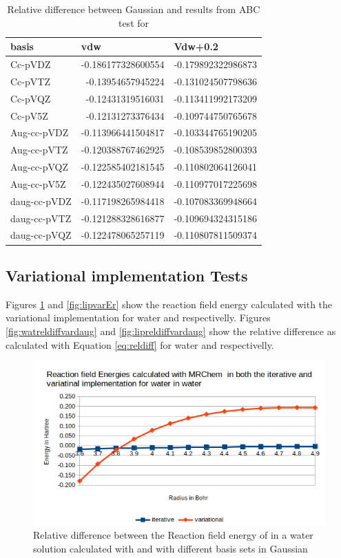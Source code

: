 \documentclass[../master_thesis.tex]{subfiles}
\begin{document}
\begin{table}[htbp]
\caption{Relative difference between Gaussian and \mrchem results from \ac{ABC}  test for }
\begin{tabular}{|l|r|r|}
\hline
basis & \multicolumn{1}{l|}{vdw} & \multicolumn{1}{l|}{Vdw+0.2} \\ \hline
Cc-pVDZ & -0.186177328600554 & -0.179892322986873 \\ \hline
Cc-pVTZ & -0.13954657945224 & -0.131024507798636 \\ \hline
Cc-pVQZ & -0.12431319516031 & -0.113411992173209 \\ \hline
Cc-pV5Z & -0.12131273376434 & -0.109744750765678 \\ \hline
Aug-cc-pVDZ & -0.113966441504817 & -0.103344765190205 \\ \hline
Aug-cc-pVTZ & -0.120388767462925 & -0.108539852800393 \\ \hline
Aug-cc-pVQZ & -0.122585402181545 & -0.110802064126041 \\ \hline
Aug-cc-pV5Z & -0.122435027608944 & -0.110977017225698 \\ \hline
daug-cc-pVDZ & -0.117198265984418 & -0.107083369948664 \\ \hline
daug-cc-pVTZ & -0.121288328616877 & -0.109694324315186 \\ \hline
daug-cc-pVQZ & -0.122478065257119 & -0.110807811509374 \\ \hline
\end{tabular}
\label{tab:acetamidabcreldiff}
\end{table}



\subsection{Variational implementation Tests}
Figures \ref{fig:watvarEr} and \ref{fig:lipvarEr} show the reaction field energy
calculated with the variational implementation for water and 
respectivelly. Figures \ref{fig:watreldiffvardaug} and \ref{fig:lipreldiffvardaug} show the
relative difference as calculated with Equation \ref{eq:reldiff} for water and 
respectivelly.

\begin{figure}[h!]
  \centering
  \includegraphics[width=0.75\linewidth]{img/watvarEr.png}
  \caption{Relative difference between the Reaction field energy of  in a water solution calculated with \mrchem
  and with different basis sets in Gaussian}
  \label{fig:watvarEr}
\end{figure}
\end{document}
